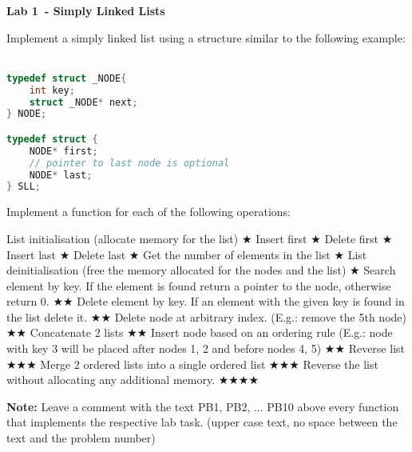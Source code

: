 \documentclass{exam}
\newcommand\labnr{1}
\newcommand\lab{Lab \labnr\ - Simply Linked Lists}
\newcommand\lvlez{$\bigstar$}
\newcommand\lvlmed{\lvlez\lvlez}
\newcommand\lvlhard{\lvlmed\lvlez}
\newcommand\lvlvhard{\lvlhard\lvlez}
\begin{document}
\begin{center}
    \vspace*{0cm}
    \bfseries\LARGE
    \lab
    \vspace*{1cm}
\end{center}

\noindent Implement a simply linked list using a structure similar to the following example:
\
\begin{lstlisting}[language=C]
typedef struct _NODE{
    int key;
    struct _NODE* next;
} NODE;

typedef struct {
    NODE* first;
    // pointer to last node is optional
    NODE* last;
} SLL;
\end{lstlisting}

\noindent Implement a function for each of the following operations:
\begin{questions}
    \question List initialisation (allocate memory for the list) \lvlez
\question Insert first \lvlez
\question Delete first \lvlez
\question Insert last \lvlez
\question Delete last \lvlez
\question Get the number of elements in the list \lvlez
\question List deinitialisation (free the memory allocated for the nodes and the list) \lvlez
\question Search element by key. If the element is found return a pointer to the node, otherwise return 0. \lvlmed
\question Delete element by key. If an element with the given key is found in the list delete it. \lvlmed
\question Delete node at arbitrary index. (E.g.: remove the 5th node) \lvlmed
\question Concatenate 2 lists \lvlmed
\question Insert node based on an ordering rule (E.g.: node with key 3 will be placed after nodes 1, 2 and before nodes 4, 5) \lvlmed
\question Reverse list \lvlhard
\question Merge 2 ordered lists into a single ordered list \lvlhard
\question Reverse the list without allocating any additional memory. \lvlvhard

\end{questions}



\bigskip
\textbf{Note:} Leave a comment with the text PB1, PB2, ... PB10 above every function that implements the respective lab task. (upper case text, no space between the text and the problem number)

\medskip
\printbibliography
\end{document}
